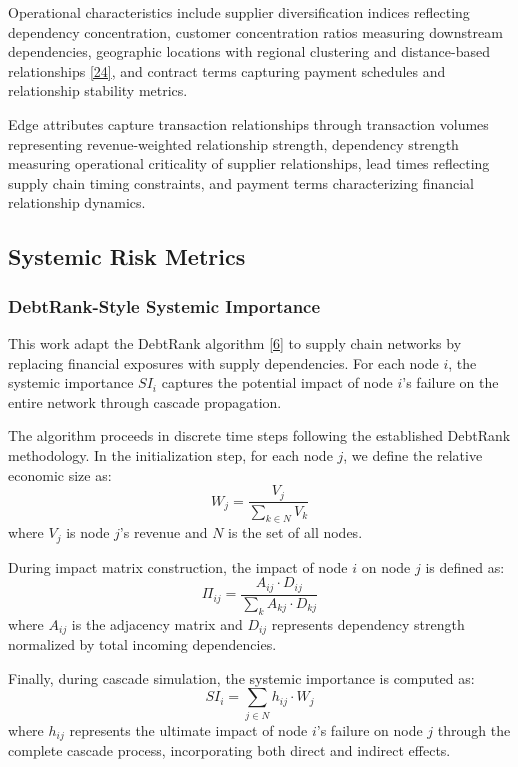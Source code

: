 \documentclass[a4 paper, 11pt,twoside]{article}
\newcommand{\0}{\Bf{0}}
\theoremstyle{definition}
\begin{document}
Operational characteristics include supplier diversification indices reflecting dependency concentration, customer concentration ratios measuring downstream dependencies, geographic locations with regional clustering and distance-based relationships \hyperref[ref24]{[24]}, and contract terms capturing payment schedules and relationship stability metrics.

Edge attributes capture transaction relationships through transaction volumes representing revenue-weighted relationship strength, dependency strength measuring operational criticality of supplier relationships, lead times reflecting supply chain timing constraints, and payment terms characterizing financial relationship dynamics.

\subsection{Systemic Risk Metrics}

\subsubsection{DebtRank-Style Systemic Importance}

This work adapt the DebtRank algorithm \hyperref[ref6]{[6]} to supply chain networks by replacing financial exposures with supply dependencies. For each node $i$, the systemic importance $SI_i$ captures the potential impact of node $i$'s failure on the entire network through cascade propagation.

The algorithm proceeds in discrete time steps following the established DebtRank methodology. In the initialization step, for each node $j$, we define the relative economic size as:
\begin{equation}
W_j = \frac{V_j}{\sum_{k \in N} V_k}
\end{equation}
where $V_j$ is node $j$'s revenue and $N$ is the set of all nodes.

During impact matrix construction, the impact of node $i$ on node $j$ is defined as:
\begin{equation}
\Pi_{ij} = \frac{A_{ij} \cdot D_{ij}}{\sum_{k} A_{kj} \cdot D_{kj}}
\end{equation}
where $A_{ij}$ is the adjacency matrix and $D_{ij}$ represents dependency strength normalized by total incoming dependencies.

Finally, during cascade simulation, the systemic importance is computed as:
\begin{equation}
SI_i = \sum_{j \in N} h_{ij} \cdot W_j
\end{equation}
where $h_{ij}$ represents the ultimate impact of node $i$'s failure on node $j$ through the complete cascade process, incorporating both direct and indirect effects.
\end{document}
